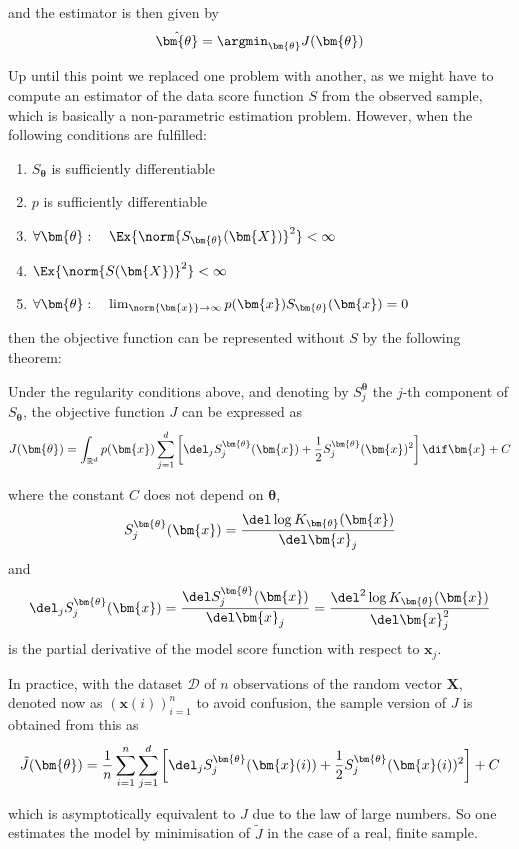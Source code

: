 and the estimator is then given by
\[
	\hat{\bm{\theta}} = \argmin_{\bm{\theta}} J(\bm{\theta})
\]

Up until this point we replaced one problem with another, as we might have to compute an estimator of the data score function $S$ from the observed sample, 
which is basically a non-parametric estimation problem.
However, when the following conditions are fulfilled:
\begin{enumerate}
	\item $S_{\bm{\theta}}$ is sufficiently differentiable
	\item $p$ is sufficiently differentiable
	\item $\forall \bm{\theta}: \quad \Ex{ \norm{ S_{\bm{\theta}}(\bm{X}) }^2 } < \infty $
	\item $\Ex{ \norm{ S(\bm{X}) }^2 } < \infty $
	\item $\forall \bm{\theta}: \quad \lim_{\norm{\bm{x}} \to \infty} p(\bm{x}) S_{\bm{\theta}}(\bm{x}) = 0$
\end{enumerate}

then the objective function can be represented without $S$ by the following theorem:

\begin{theorem}
Under the regularity conditions above, and denoting by $S_j^{\bm{\theta}}$ the $j$-th component of $S_{\bm{\theta}}$, the objective function $J$ can be expressed as
\[
	J(\bm{\theta}) = \int_{\mathbb{R}^d} p(\bm{x}) \sum_{j = 1}^d \left[ \del_j S_j^{\bm{\theta}} (\bm{x}) + \frac{1}{2} S_j^{\bm{\theta}}(\bm{x})^2 \right] \dif \bm{x} + C
\]

where the constant $C$ does not depend on $\bm{\theta}$,
\[
	S_j^{\bm{\theta}} (\bm{x}) = \frac{\del \log K_{\bm{\theta}}(\bm{x}) }{\del \bm{x}_j }
\]
and 
\[
	\del_j S_j^{\bm{\theta}} (\bm{x}) = \frac{\del S_j^{\bm{\theta}} (\bm{x}) }{\del \bm{x}_j } = \frac{\del^2 \log K_{\bm{\theta}}(\bm{x}) }{\del \bm{x}_j^2 }
\]
is the partial derivative of the model score function with respect to $\bm{x}_j$.
\end{theorem}

In practice, with the dataset $\mathcal{D}$ of $n$ observations of the random vector $\bm{X}$, denoted now as $(\bm{x}( i ) )_{i = 1}^n$ to avoid confusion, 
the sample version of $J$ is obtained from this as
\[
	\tilde{J}(\bm{\theta}) = \frac{1}{n} \sum_{i = 1}^n \sum_{j = 1}^d \left[ \del_j S_j^{\bm{\theta}} ( \bm{x}(i) ) + \frac{1}{2} S_j^{\bm{\theta}}( \bm{x}(i) )^2 \right] + C
\]

which is asymptotically equivalent to $J$ due to the law of large numbers. 
So one estimates the model by minimisation of $\tilde{J}$ in the case of a real, finite sample.

